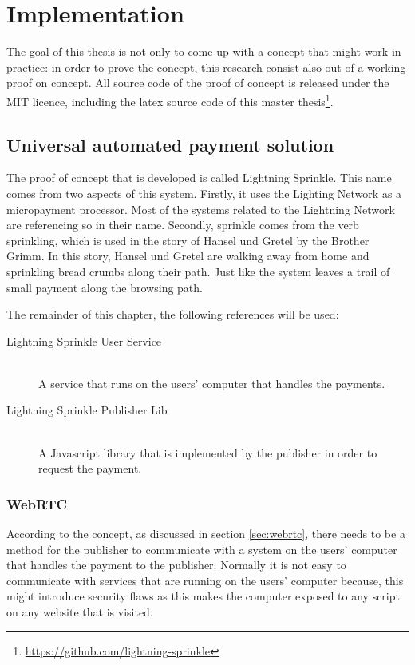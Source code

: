 \chapter{Implementation}
\label{cha:implementation}

The goal of this thesis is not only to come up with a concept that might work in practice: in order to prove the concept, this research consist also out of a working proof on concept. All source code of the proof of concept is released under the MIT licence, including the latex source code of this master thesis\footnote{\url{https://github.com/lightning-sprinkle}}.

\section{Universal automated payment solution}
The proof of concept that is developed is called Lightning Sprinkle. This name comes from two aspects of this system. Firstly, it uses the Lighting Network as a micropayment processor. Most of the systems related to the Lightning Network are referencing so in their name. Secondly, sprinkle comes from the verb sprinkling, which is used in the story of Hansel und Gretel by the Brother Grimm. In this story, Hansel und Gretel are walking away from home and sprinkling bread crumbs along their path. Just like the system leaves a trail of small payment along the browsing path.

The remainder of this chapter, the following references will be used:

\begin{description}
  \item[Lightning Sprinkle User Service] \hfill \\ A service that runs on the users' computer that handles the payments.
  \item[Lightning Sprinkle Publisher Lib] \hfill \\ A Javascript library that is implemented by the publisher in order to request the payment.
\end{description} 

\subsection{WebRTC}
According to the concept, as discussed in section \ref{sec:webrtc}, there needs to be a method for the publisher to communicate with a system on the users' computer that handles the payment to the publisher. Normally it is not easy to communicate with services that are running on the users' computer because, this might introduce security flaws as this makes the computer exposed to any script on any website that is visited. 

